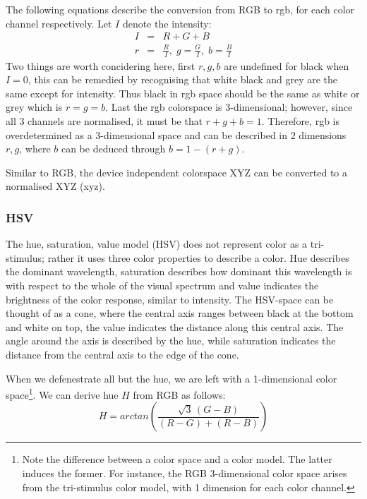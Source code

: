 \documentclass[a4paper,11pt]{article}
\begin{document}
The following equations describe the conversion from RGB to rgb, for each color channel respectively.  Let $I$ denote the intensity:
\begin{eqnarray}
\label{eq:rgb}
I &=& R+G+B \\
r &=& \frac{R}{I},\; g = \frac{G}{I},\; b = \frac{B}{I}
\end{eqnarray}
Two things are worth concidering here, first $r,g,b$ are undefined for black when $I=0$, this can be remedied by recognising that white black and grey are the same except for intensity. Thus black in rgb space should be the same as white or grey which is $r=g=b$. Last the rgb colorspace is 3-dimensional; however, since all 3 channels are normalised, it must be that $r+g+b=1$. Therefore, rgb is overdetermined as a 3-dimensional space and can be described in 2 dimensions $r,g$, where $b$ can be deduced through $b=1-(r+g)$.

Similar to RGB, the device independent colorspace XYZ can be converted to a normalised XYZ (xyz).		

\subsubsection{HSV}

The hue, saturation, value model (HSV) does not represent color as a tri-stimulus; rather it uses three color properties to describe a color. Hue describes the dominant wavelength, saturation describes how dominant this wavelength is with respect to the whole of the visual spectrum and value indicates the brightness of the color response, similar to intensity. The HSV-space can be thought of as a cone, where the central axis ranges between black at the bottom and white on top, the value indicates the distance along this central axis. The angle around the axis is described by the hue, while saturation indicates the distance from the central axis to the edge of the cone. 

When we defenestrate all but the hue, we are left with a 1-dimensional color space\footnote{Note the difference between a color space and a color model. The latter induces the former. For instance, the RGB 3-dimensional color space arises from the tri-stimulus color model, with 1 dimension for each color channel.}.  We can derive hue $H$ from RGB as follows:
\begin{equation}
\label{eq:hue}
H = arctan\left(\frac{\sqrt{3}\,(G-B)}{(R-G)+(R-B)}\right)
\end{equation} 
\end{document}

